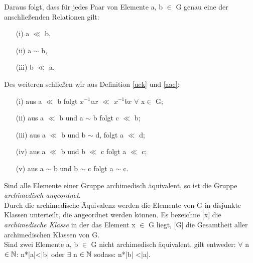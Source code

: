 \begin{folg}
Daraus folgt, dass für jedes Paar von Elemente a, b $\in$ G genau eine der anschließenden Relationen gilt: 
\begin{multicols}{3}
\begin{enumerate}
\item[(i)] a $\ll$ b, 
\item[(ii)] a $\sim$ b,
\item[(iii)] b $\ll$ a. 
\end{enumerate}
\end{multicols}
%
Des weiteren schließen wir aus Definition \ref{uek} und \ref{aae}:
\begin{enumerate}
\item[(i)] aus a $\ll$ b folgt $x^{-1}ax $ $\ll$ $x^{-1}bx$ $\forall$ x$\in$ G;
\item[(ii)] aus a $\ll$ b und a $\sim$ b folgt c $\ll$ b;
\item[(iii)] aus a $\ll$ b und b $\sim$ d, folgt a $\ll$ d;
\item[(iv)] aus a $\ll$ b und b $\ll$ c folgt a $\ll$ c;
\item[(v)] aus a $\sim$ b und b $\sim$ c folgt a $\sim$ c.
\end{enumerate}
Sind alle Elemente einer Gruppe archimedisch äquivalent, so ist die Gruppe \textit{archimedisch angeordnet}. \\ 
Durch die archimedische Äquivalenz werden die Elemente von G in disjunkte Klassen unterteilt, die angeordnet werden können. Es bezeichne [x] die \textit{archimedische Klasse} in der das Element x $\in$ G liegt, [G] die Gesamtheit aller archimedischen Klassen von G. \\
Sind zwei Elemente a, b $\in$ G nicht archimedisch äquivalent, gilt entweder:
$\forall$ n $\in \mathbb{N}$: n*|a|<|b| oder $\exists$ n $\in \mathbb{N} $ sodass: n*|b| <|a|.
\end{folg}
%
%
%
